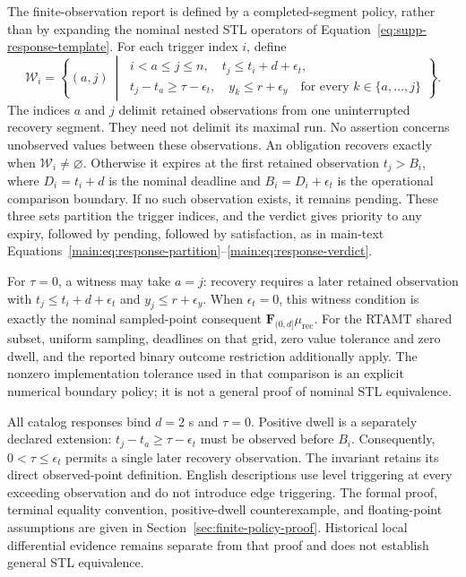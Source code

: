 The finite-observation report is defined by a completed-segment policy, rather than by expanding the nominal nested STL operators of Equation~\eqref{eq:supp-response-template}. For each trigger index $i$, define
\begin{equation}
 \mathcal{W}_i=\left\{(a,j)\ \middle|\
 \begin{array}{l}
 i<a\le j\le n,\quad t_j\le t_i+d+\epsilon_t,\\[-1mm]
 t_j-t_a\ge\tau-\epsilon_t,\quad
 y_k\le r+\epsilon_y\quad\text{for every }k\in\{a,\ldots,j\}
 \end{array}\right\}.
 \label{eq:supp-witness-set}
\end{equation}
The indices $a$ and $j$ delimit retained observations from one uninterrupted recovery segment. They need not delimit its maximal run. No assertion concerns unobserved values between these observations. An obligation recovers exactly when $\mathcal{W}_i\ne\varnothing$. Otherwise it expires at the first retained observation $t_j>B_i$, where $D_i=t_i+d$ is the nominal deadline and $B_i=D_i+\epsilon_t$ is the operational comparison boundary. If no such observation exists, it remains pending. These three sets partition the trigger indices, and the verdict gives priority to any expiry, followed by pending, followed by satisfaction, as in main-text Equations~\eqref{main:eq:response-partition}--\eqref{main:eq:response-verdict}.

For $\tau=0$, a witness may take $a=j$: recovery requires a later retained observation with $t_j\le t_i+d+\epsilon_t$ and $y_j\le r+\epsilon_y$. When $\epsilon_t=0$, this witness condition is exactly the nominal sampled-point consequent $\mathbf{F}_{(0,d]}\mu_{\mathrm{rec}}$. For the RTAMT shared subset, uniform sampling, deadlines on that grid, zero value tolerance and zero dwell, and the reported binary outcome restriction additionally apply. The nonzero implementation tolerance used in that comparison is an explicit numerical boundary policy; it is not a general proof of nominal STL equivalence.

All catalog responses bind $d=2$ s and $\tau=0$. Positive dwell is a separately declared extension: $t_j-t_a\geq\tau-\epsilon_t$ must be observed before $B_i$. Consequently, $0<\tau\leq\epsilon_t$ permits a single later recovery observation. The invariant retains its direct observed-point definition. English descriptions use level triggering at every exceeding observation and do not introduce edge triggering. The formal proof, terminal equality convention, positive-dwell counterexample, and floating-point assumptions are given in Section~\ref{sec:finite-policy-proof}. Historical local differential evidence remains separate from that proof and does not establish general STL equivalence.
